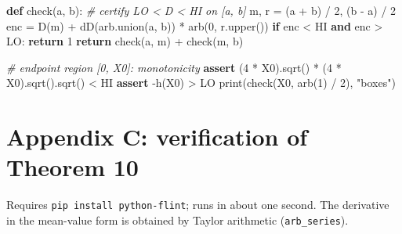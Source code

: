 \documentclass[
  11pt,
]{article}
\newenvironment{Shaded}{}{}
\newcommand{\BuiltInTok}[1]{\textcolor[rgb]{0.00,0.50,0.00}{#1}}
\newcommand{\CommentTok}[1]{\textcolor[rgb]{0.38,0.63,0.69}{\textit{#1}}}
\newcommand{\ControlFlowTok}[1]{\textcolor[rgb]{0.00,0.44,0.13}{\textbf{#1}}}
\newcommand{\DecValTok}[1]{\textcolor[rgb]{0.25,0.63,0.44}{#1}}
\newcommand{\KeywordTok}[1]{\textcolor[rgb]{0.00,0.44,0.13}{\textbf{#1}}}
\newcommand{\NormalTok}[1]{#1}
\newcommand{\OperatorTok}[1]{\textcolor[rgb]{0.40,0.40,0.40}{#1}}
\newcommand{\StringTok}[1]{\textcolor[rgb]{0.25,0.44,0.63}{#1}}
\begin{document}
\begin{Shaded}
\begin{Highlighting}[]
\KeywordTok{def}\NormalTok{ check(a, b):                }\CommentTok{\# certify LO \textless{} D \textless{} HI on [a, b]}
\NormalTok{    m, r }\OperatorTok{=}\NormalTok{ (a }\OperatorTok{+}\NormalTok{ b) }\OperatorTok{/} \DecValTok{2}\NormalTok{, (b }\OperatorTok{{-}}\NormalTok{ a) }\OperatorTok{/} \DecValTok{2}
\NormalTok{    enc }\OperatorTok{=}\NormalTok{ D(m) }\OperatorTok{+}\NormalTok{ dD(arb.union(a, b)) }\OperatorTok{*}\NormalTok{ arb(}\DecValTok{0}\NormalTok{, r.upper())}
    \ControlFlowTok{if}\NormalTok{ enc }\OperatorTok{\textless{}}\NormalTok{ HI }\KeywordTok{and}\NormalTok{ enc }\OperatorTok{\textgreater{}}\NormalTok{ LO:}
        \ControlFlowTok{return} \DecValTok{1}
    \ControlFlowTok{return}\NormalTok{ check(a, m) }\OperatorTok{+}\NormalTok{ check(m, b)}

\CommentTok{\# endpoint region [0, X0]: monotonicity}
\ControlFlowTok{assert}\NormalTok{ (}\DecValTok{4} \OperatorTok{*}\NormalTok{ X0).sqrt() }\OperatorTok{*}\NormalTok{ (}\DecValTok{4} \OperatorTok{*}\NormalTok{ X0).sqrt().sqrt() }\OperatorTok{\textless{}}\NormalTok{ HI}
\ControlFlowTok{assert} \OperatorTok{{-}}\NormalTok{h(X0) }\OperatorTok{\textgreater{}}\NormalTok{ LO}
\BuiltInTok{print}\NormalTok{(check(X0, arb(}\DecValTok{1}\NormalTok{) }\OperatorTok{/} \DecValTok{2}\NormalTok{), }\StringTok{"boxes"}\NormalTok{)}
\end{Highlighting}
\end{Shaded}

\hypertarget{appendix-c-verification-of-theorem-10}{%
\section*{Appendix C: verification of Theorem
10}\label{appendix-c-verification-of-theorem-10}}

Requires \texttt{pip\ install\ python-flint}; runs in about one second.
The derivative in the mean-value form is obtained by Taylor arithmetic
(\texttt{arb\_series}).
\end{document}

